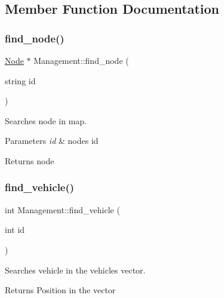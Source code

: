 \subsection{Member Function Documentation}
\mbox{\label{class_management_a901f0f1aba1db0da4e015c60abec104d}} 
\subsubsection{\texorpdfstring{find\+\_\+node()}{find\_node()}}
{\footnotesize\ttfamily \mbox{\hyperlink{class_node}{Node}} $\ast$ Management\+::find\+\_\+node (\begin{DoxyParamCaption}\item[{string}]{id }\end{DoxyParamCaption})}



Searches node in map. 


\begin{DoxyParams}{Parameters}
{\em id} & node\textquotesingle{}s id \\
\hline
\end{DoxyParams}
\begin{DoxyReturn}{Returns}
node 
\end{DoxyReturn}
\mbox{\label{class_management_a79bd0ad615c9d128e5d81c07a033c4d8}} 
\subsubsection{\texorpdfstring{find\+\_\+vehicle()}{find\_vehicle()}}
{\footnotesize\ttfamily int Management\+::find\+\_\+vehicle (\begin{DoxyParamCaption}\item[{int}]{id }\end{DoxyParamCaption})}



Searches vehicle in the vehicles vector. 

\begin{DoxyReturn}{Returns}
Position in the vector 
\end{DoxyReturn}
\mbox{\label{class_management_a25150de3fee6dc27f4450ff4f1d79ef7}} 
